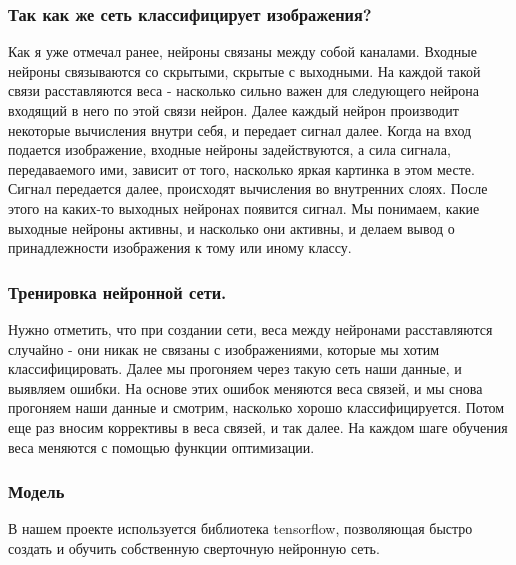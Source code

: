 \subsubsection*{Так как же сеть классифицирует изображения?}
Как я уже отмечал ранее, нейроны связаны между собой каналами. 
Входные нейроны связываются со скрытыми, скрытые с выходными. На каждой такой связи расставляются веса - насколько сильно важен для следующего нейрона входящий в него по этой связи нейрон. Далее каждый нейрон производит некоторые вычисления внутри себя, и передает сигнал далее.
Когда на вход подается изображение, входные нейроны задействуются, а сила сигнала, передаваемого ими, зависит от того, насколько яркая картинка в этом месте. Сигнал передается далее, происходят вычисления во внутренних слоях. После этого на каких-то выходных нейронах появится сигнал. Мы понимаем, какие выходные нейроны активны, и насколько они активны, и делаем вывод о принадлежности изображения к тому или иному классу.
\subsubsection*{Тренировка нейронной сети.}
Нужно отметить, что при создании сети, веса между нейронами расставляются случайно - они никак не связаны с изображениями, которые мы хотим классифицировать. Далее мы прогоняем через такую сеть наши данные, и выявляем ошибки. На основе этих ошибок меняются веса связей, и мы снова прогоняем наши данные и смотрим, насколько хорошо классифицируется. Потом еще раз вносим коррективы в веса связей, и так далее. На каждом шаге обучения веса меняются с помощью функции оптимизации.


\subsubsection*{Модель}

В нашем проекте используется библиотека tensorflow, позволяющая быстро создать и обучить собственную сверточную нейронную сеть. 

